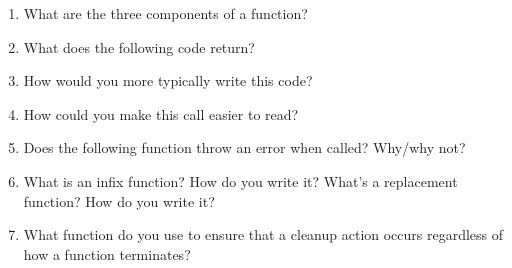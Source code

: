 \begin{enumerate}
\def\labelenumi{\arabic{enumi}.}
\item
  What are the three components of a function?
\item
  What does the following code return?

\begin{Shaded}
\begin{Highlighting}[]
\StringTok{ }
\StringTok{ }
    \StringTok{ }
  \NormalTok{\}}
\NormalTok{\}}
\NormalTok{(}\NormalTok{)()}
\end{Highlighting}
\end{Shaded}
\item
  How would you more typically write this code?

\begin{Shaded}
\begin{Highlighting}[]
\DataTypeTok{+}\NormalTok{(}\NormalTok{, }\DataTypeTok{*}\NormalTok{(}\NormalTok{, }\NormalTok{))}
\end{Highlighting}
\end{Shaded}
\item
  How could you make this call easier to read?

\begin{Shaded}
\begin{Highlighting}[]
\NormalTok{(, }\NormalTok{, } \NormalTok{(}\NormalTok{:}\NormalTok{, }\NormalTok{))}
\end{Highlighting}
\end{Shaded}
\item
  Does the following function throw an error when called? Why/why not?

\begin{Shaded}
\begin{Highlighting}[]
\StringTok{ }
  \StringTok{ }
\NormalTok{\}}
\NormalTok{(}\NormalTok{, }\NormalTok{(}\NormalTok{))}
\end{Highlighting}
\end{Shaded}
\item
  What is an infix function? How do you write it? What's a replacement
  function? How do you write it?
\item
  What function do you use to ensure that a cleanup action occurs
  regardless of how a function terminates?
\end{enumerate}


